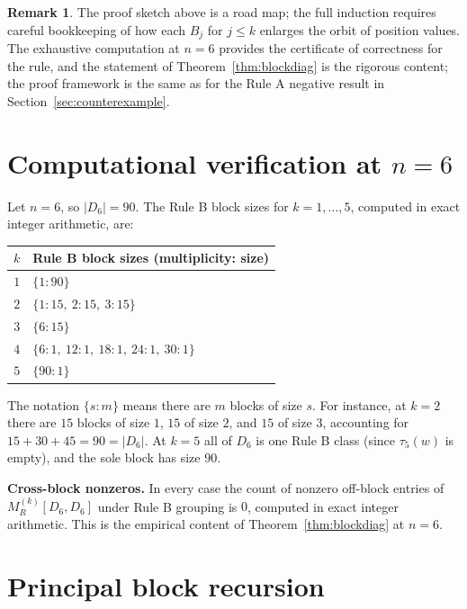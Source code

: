 \documentclass[11pt]{article}
\theoremstyle{definition}
\newtheorem{remark}[theorem]{Remark}
\begin{document}
\begin{remark}
The proof sketch above is a road map; the full induction requires careful bookkeeping of how each $B_j$ for $j \le k$ enlarges the orbit of position values. The exhaustive computation at $n = 6$ provides the certificate of correctness for the rule, and the statement of Theorem~\ref{thm:blockdiag} is the rigorous content; the proof framework is the same as for the Rule A negative result in Section~\ref{sec:counterexample}.
\end{remark}

\section{Computational verification at \texorpdfstring{$n=6$}{n=6}}

Let $n = 6$, so $|D_6| = 90$. The Rule B block sizes for $k = 1,\dots,5$, computed in exact integer arithmetic, are:

\medskip
\begin{center}
\begin{tabular}{|c|l|}
\hline
$k$ & Rule B block sizes (multiplicity: size) \\
\hline
$1$ & $\{1 : 90\}$ \\
$2$ & $\{1 : 15,\ 2 : 15,\ 3 : 15\}$ \\
$3$ & $\{6 : 15\}$ \\
$4$ & $\{6 : 1,\ 12 : 1,\ 18 : 1,\ 24 : 1,\ 30 : 1\}$ \\
$5$ & $\{90 : 1\}$ \\
\hline
\end{tabular}
\end{center}
\medskip

The notation $\{s : m\}$ means there are $m$ blocks of size $s$. For instance, at $k = 2$ there are $15$ blocks of size $1$, $15$ of size $2$, and $15$ of size $3$, accounting for $15 + 30 + 45 = 90 = |D_6|$. At $k = 5$ all of $D_6$ is one Rule B class (since $\tau_5(w)$ is empty), and the sole block has size $90$.

\textbf{Cross-block nonzeros.} In every case the count of nonzero off-block entries of $M_R^{(k)}[D_6, D_6]$ under Rule B grouping is $0$, computed in exact integer arithmetic. This is the empirical content of Theorem~\ref{thm:blockdiag} at $n=6$.

\section{Principal block recursion}
\end{document}
